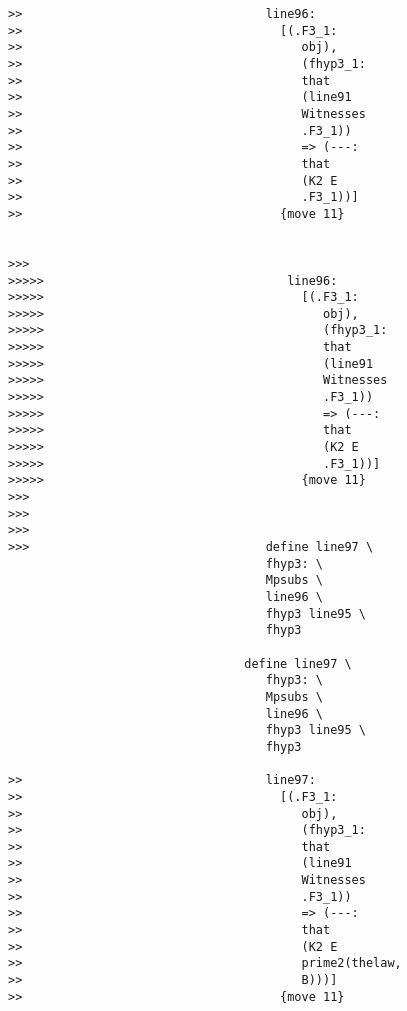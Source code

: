 \documentclass[12pt]{article}
\begin{document}
\begin{verbatim}
>>                                  line96:
>>                                    [(.F3_1:
>>                                       obj),
>>                                       (fhyp3_1:
>>                                       that
>>                                       (line91
>>                                       Witnesses
>>                                       .F3_1))
>>                                       => (---:
>>                                       that
>>                                       (K2 E
>>                                       .F3_1))]
>>                                    {move 11}


>>>
>>>>>                                  line96:
>>>>>                                    [(.F3_1:
>>>>>                                       obj),
>>>>>                                       (fhyp3_1:
>>>>>                                       that
>>>>>                                       (line91
>>>>>                                       Witnesses
>>>>>                                       .F3_1))
>>>>>                                       => (---:
>>>>>                                       that
>>>>>                                       (K2 E
>>>>>                                       .F3_1))]
>>>>>                                    {move 11}
>>>
>>>
>>>
>>>                                 define line97 \
                                    fhyp3: \
                                    Mpsubs \
                                    line96 \
                                    fhyp3 line95 \
                                    fhyp3

                                 define line97 \
                                    fhyp3: \
                                    Mpsubs \
                                    line96 \
                                    fhyp3 line95 \
                                    fhyp3

>>                                  line97:
>>                                    [(.F3_1:
>>                                       obj),
>>                                       (fhyp3_1:
>>                                       that
>>                                       (line91
>>                                       Witnesses
>>                                       .F3_1))
>>                                       => (---:
>>                                       that
>>                                       (K2 E
>>                                       prime2(thelaw,
>>                                       B)))]
>>                                    {move 11}



\end{verbatim}
\end{document}
